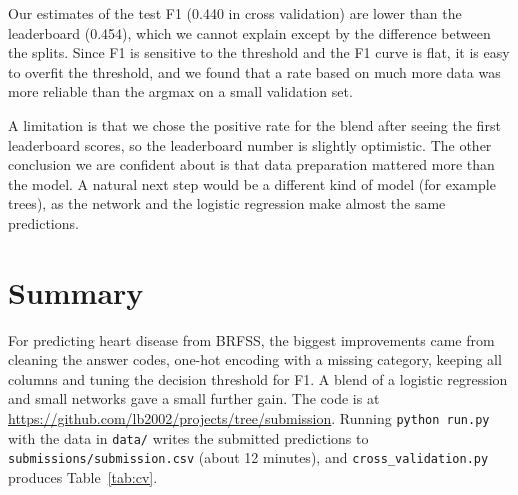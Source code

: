 \documentclass[10pt,conference,compsocconf]{IEEEtran}
\begin{document}
Our estimates of the test F1 (0.440 in cross validation) are lower than the leaderboard (0.454), which we cannot explain except by the difference between the splits. Since F1 is sensitive to the threshold and the F1 curve is flat, it is easy to overfit the threshold, and we found that a rate based on much more data was more reliable than the argmax on a small validation set.

A limitation is that we chose the positive rate for the blend after seeing the first leaderboard scores, so the leaderboard number is slightly optimistic. The other conclusion we are confident about is that data preparation mattered more than the model. A natural next step would be a different kind of model (for example trees), as the network and the logistic regression make almost the same predictions.

\section{Summary}

For predicting heart disease from BRFSS, the biggest improvements came from cleaning the answer codes, one-hot encoding with a missing category, keeping all columns and tuning the decision threshold for F1. A blend of a logistic regression and small networks gave a small further gain. The code is at \url{https://github.com/lb2002/projects/tree/submission}. Running \texttt{python run.py} with the data in \texttt{data/} writes the submitted predictions to \texttt{submissions/submission.csv} (about 12 minutes), and \texttt{cross\_validation.py} produces Table~\ref{tab:cv}.



\end{document}
